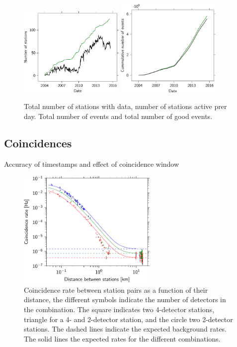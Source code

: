 \begin{figure}
    \centering
    \includegraphics[width=0.45\textwidth]
                    {plots/experiment/active_stations}
    \includegraphics[width=0.45\textwidth]
                    {plots/experiment/luminosity_network}
    \caption{Total number of stations with data, number of stations active prer day. Total number of events and total number of good events.}
    \label{fig:active-luminosity}
\end{figure}



\subsection{Coincidences}

Accuracy of timestamps and effect of coincidence window

\begin{figure}
    \centering
    \includegraphics[width=0.6\textwidth]
                    {plots/experiment/distance_v_coincidence_rate}
    \caption{Coincidence rate between station pairs as a function of their distance, the different symbols indicate the number of detectors in the combination. The square indicates two 4-detector stations, triangle for a 4- and 2-detector station, and the circle two 2-detector stations. The dashed lines indicate the expected background rates. The solid lines the expected rates for the different combinations.}
    \label{fig:network-distances}
\end{figure}


